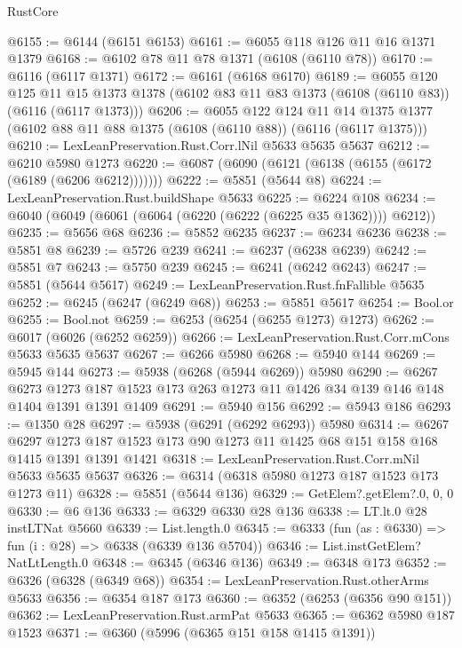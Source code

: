 \begin{lexlean}{RustCore}
\begin{coremodule}
@6155 := @6144 (@6151 @6153)
@6161 := @6055 @118 @126 @11 @16 @1371 @1379
@6168 := @6102 @78 @11 @78 @1371 (@6108 (@6110 @78))
@6170 := @6116 (@6117 @1371)
@6172 := @6161 (@6168 @6170)
@6189 := @6055
    @120
    @125
    @11
    @15
    @1373
    @1378
    (@6102 @83 @11 @83 @1373 (@6108 (@6110 @83)) (@6116 (@6117 @1373)))
@6206 := @6055
    @122
    @124
    @11
    @14
    @1375
    @1377
    (@6102 @88 @11 @88 @1375 (@6108 (@6110 @88)) (@6116 (@6117 @1375)))
@6210 := LexLeanPreservation.Rust.Corr.lNil @5633 @5635 @5637
@6212 := @6210 @5980 @1273
@6220 := @6087 (@6090 (@6121 (@6138 (@6155 (@6172 (@6189 (@6206 @6212)))))))
@6222 := @5851 (@5644 @8)
@6224 := LexLeanPreservation.Rust.buildShape @5633
@6225 := @6224 @108
@6234 := @6040 (@6049 (@6061 (@6064 (@6220 (@6222 (@6225 @35 @1362)))) @6212))
@6235 := @5656 @68
@6236 := @5852 @6235
@6237 := @6234 @6236
@6238 := @5851 @8
@6239 := @5726 @239
@6241 := @6237 (@6238 @6239)
@6242 := @5851 @7
@6243 := @5750 @239
@6245 := @6241 (@6242 @6243)
@6247 := @5851 (@5644 @5617)
@6249 := LexLeanPreservation.Rust.fnFallible @5635
@6252 := @6245 (@6247 (@6249 @68))
@6253 := @5851 @5617
@6254 := Bool.or
@6255 := Bool.not
@6259 := @6253 (@6254 (@6255 @1273) @1273)
@6262 := @6017 (@6026 (@6252 @6259))
@6266 := LexLeanPreservation.Rust.Corr.mCons @5633 @5635 @5637
@6267 := @6266 @5980
@6268 := @5940 @144
@6269 := @5945 @144
@6273 := @5938 (@6268 (@5944 @6269)) @5980
@6290 := @6267
    @6273
    @1273
    @187
    @1523
    @173
    @263
    @1273
    @11
    @1426
    @34
    @139
    @146
    @148
    @1404
    @1391
    @1391
    @1409
@6291 := @5940 @156
@6292 := @5943 @186
@6293 := @1350 @28
@6297 := @5938 (@6291 (@6292 @6293)) @5980
@6314 := @6267
    @6297
    @1273
    @187
    @1523
    @173
    @90
    @1273
    @11
    @1425
    @68
    @151
    @158
    @168
    @1415
    @1391
    @1391
    @1421
@6318 := LexLeanPreservation.Rust.Corr.mNil @5633 @5635 @5637
@6326 := @6314 (@6318 @5980 @1273 @187 @1523 @173 @1273 @11)
@6328 := @5851 (@5644 @136)
@6329 := GetElem?.getElem?.{0, 0, 0}
@6330 := @6 @136
@6333 := @6329 @6330 @28 @136
@6338 := LT.lt.{0} @28 instLTNat @5660
@6339 := List.length.{0}
@6345 := @6333 (fun (as : @6330) => fun (i : @28) => @6338 (@6339 @136 @5704))
@6346 := List.instGetElem?NatLtLength.{0}
@6348 := @6345 (@6346 @136)
@6349 := @6348 @173
@6352 := @6326 (@6328 (@6349 @68))
@6354 := LexLeanPreservation.Rust.otherArms @5633
@6356 := @6354 @187 @173
@6360 := @6352 (@6253 (@6356 @90 @151))
@6362 := LexLeanPreservation.Rust.armPat @5633
@6365 := @6362 @5980 @187 @1523
@6371 := @6360 (@5996 (@6365 @151 @158 @1415 @1391))

\end{coremodule}
\end{lexlean}
